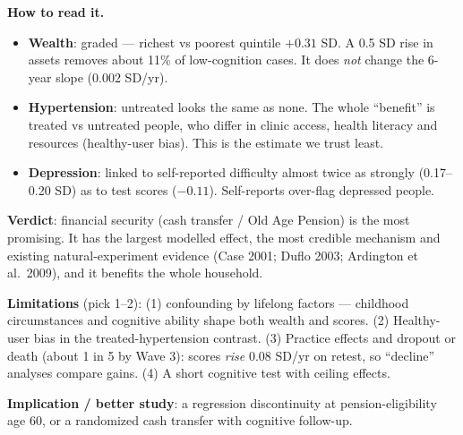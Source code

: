 \documentclass[10pt]{article}
\begin{document}
\textbf{How to read it.}
\begin{itemize}
\item \textbf{Wealth}: graded --- richest vs poorest quintile $+0.31$ SD. A 0.5 SD rise in assets
  removes about 11\% of low-cognition cases. It does \emph{not} change the 6-year slope
  (0.002 SD/yr).
\item \textbf{Hypertension}: untreated looks the same as none. The whole ``benefit'' is treated
  vs untreated people, who differ in clinic access, health literacy and resources
  (healthy-user bias). This is the estimate we trust least.
\item \textbf{Depression}: linked to self-reported difficulty almost twice as strongly
  (0.17--0.20 SD) as to test scores ($-0.11$). Self-reports over-flag depressed people.
\end{itemize}
\textbf{Verdict}: financial security (cash transfer / Old Age Pension) is the most promising. It has
the largest modelled effect, the most credible mechanism and existing natural-experiment evidence
(Case 2001; Duflo 2003; Ardington et al.\ 2009), and it benefits the whole household.

\textbf{Limitations} (pick 1--2): (1) confounding by lifelong factors --- childhood
circumstances and cognitive ability shape both wealth and scores. (2) Healthy-user bias in the
treated-hypertension contrast. (3) Practice effects and dropout or death (about 1 in 5 by Wave 3):
scores \emph{rise} 0.08 SD/yr on retest, so ``decline'' analyses compare gains. (4) A short
cognitive test with ceiling effects.

\textbf{Implication / better study}: a regression discontinuity at pension-eligibility age 60, or a
randomized cash transfer with cognitive follow-up.
\end{document}
